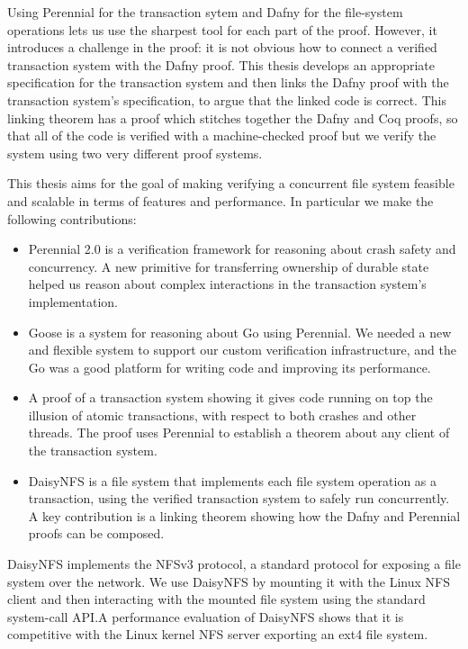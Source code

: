 Using Perennial for the transaction sytem and Dafny for the file-system
operations lets us use the sharpest tool for each part of the proof. However, it
introduces a challenge in the proof: it is not obvious how to connect a verified
transaction system with the Dafny proof. This thesis develops an appropriate
specification for the transaction system and then links the Dafny proof with the
transaction system's specification, to
argue that the linked code is correct. This linking theorem has a proof which stitches together
the Dafny and Coq proofs, so that all of the code is verified with a
machine-checked proof but we verify the system using two very different proof
systems.

This thesis aims for the goal of making verifying a concurrent file system
feasible and scalable in terms of features and performance. In particular we
make the following contributions:
\begin{itemize}
  \item Perennial 2.0 is a verification framework for reasoning about crash
  safety and concurrency. A new primitive for transferring ownership of durable
  state helped us reason about complex interactions in the transaction system's
  implementation.
  \item Goose is a system for reasoning about Go using Perennial. We needed a
  new and flexible system to support our custom verification infrastructure, and
  the Go was a good platform for writing code and improving its performance.
  \item A proof of a transaction system showing it gives code running on top the
  illusion of atomic transactions, with respect to both crashes and other
  threads. The proof uses Perennial to establish a theorem about any client of the
  transaction system.
  \item DaisyNFS is a file system that implements each file system operation as
  a transaction, using the verified transaction system to safely run
  concurrently. A key contribution is a linking theorem showing how
  the Dafny and Perennial proofs can be composed.
\end{itemize}

DaisyNFS implements the NFSv3 protocol, a standard protocol for exposing
a file system over the network. We use DaisyNFS by mounting it with the
Linux NFS client and then interacting with the mounted file system using
the standard system-call API.\@ A performance evaluation of DaisyNFS shows
that it is competitive with the Linux kernel NFS server exporting an
ext4 file system.

